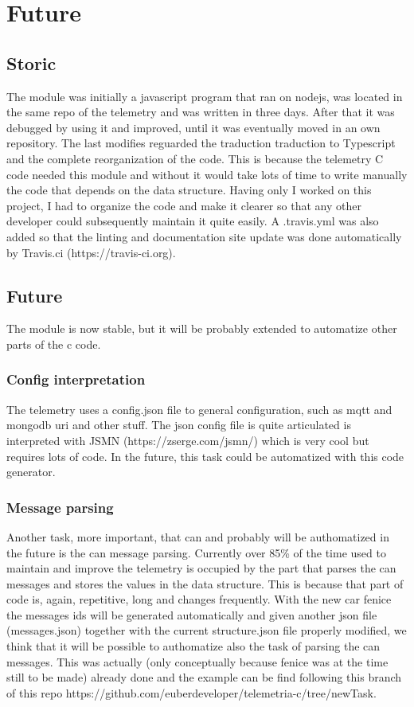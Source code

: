 \section{\huge{Future}}

\subsection{Storic}
The module was initially a javascript program that ran on nodejs, was located in the same repo of the telemetry and was written in three days.
After that it was debugged by using it and improved, until it was eventually moved in an own repository. The last modifies reguarded the traduction traduction
to Typescript and the complete reorganization of the code. This is because the telemetry C code needed this module and without it would take
lots of time to write manually the code that depends on the data structure. Having only I worked on this project, I had to organize the code and
make it clearer so that any other developer could subsequently maintain it quite easily. A .travis.yml was also added so that the linting and 
documentation site update was done automatically by Travis.ci (https://travis-ci.org).

\subsection{Future}
The module is now stable, but it will be probably extended to automatize other parts of the c code.

\subsubsection{Config interpretation}
The telemetry uses a config.json file to general configuration, such as mqtt and mongodb uri and other stuff. The json config file is quite
articulated is interpreted with JSMN (https://zserge.com/jsmn/) which is very cool but requires lots of code. In the future, this task could
be automatized with this code generator.

\subsubsection{Message parsing}
Another task, more important, that can and probably will be authomatized in the future is the can message parsing. Currently over 85\% of the time
used to maintain and improve the telemetry is occupied by the part that parses the can messages and stores the values in the data structure.
This is because that part of code is, again, repetitive, long and changes frequently. With the new car fenice the messages ids will be generated
automatically and given another json file (messages.json) together with the current structure.json file properly modified, we think that it will
be possible to authomatize also the task of parsing the can messages. This was actually (only conceptually because fenice was at the time still to be
made) already done and the example can be find following this branch of this repo https://github.com/euberdeveloper/telemetria-c/tree/newTask.